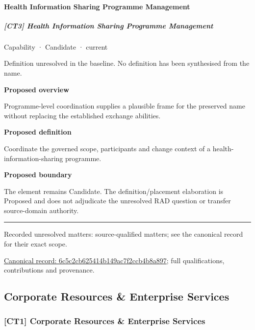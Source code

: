 \paragraph{Health Information Sharing Programme Management}

\subparagraph{[CT3] Health Information Sharing Programme Management}

\label{element:6c5c2cb625414b149ac7f2ccb4b8a897}
{\small Capability · Candidate · current}\par

Definition unresolved in the baseline. No definition has been synthesised from the name.



\textbf{Proposed overview}



Programme-level coordination supplies a plausible frame for the preserved name without replacing the established exchange abilities.



\textbf{Proposed definition}



Coordinate the governed scope, participants and change context of a health-information-sharing programme.



\textbf{Proposed boundary}



The element remains Candidate. The definition/placement elaboration is Proposed and does not adjudicate the unresolved RAD question or transfer source-domain authority.



\medskip\hrule\medskip

{\small Recorded unresolved matters: source-qualified matters; see the canonical record for their exact scope.}\par
{\footnotesize \href{../../../../continuum/strategy/capability/6c5c2cb625414b149ac7f2ccb4b8a897.md}{Canonical record: 6c5c2cb625414b149ac7f2ccb4b8a897}; full qualifications, contributions and provenance.}\par
\subsection{Corporate Resources \& Enterprise Services}

\subsubsection{[CT1] Corporate Resources \& Enterprise Services}

